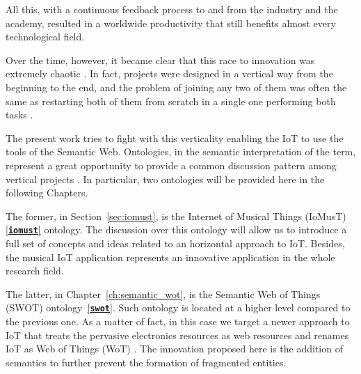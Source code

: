 \documentclass[11pt, twoside, openright]{report}   	%
\newcommand{\ontoref}[1]{\hyperref[sec:ontology_list]{[\textbf{\texttt{#1}}]}}
\begin{document}
All this, with a continuous feedback process to and from the industry and the academy, resulted in a worldwide productivity that still benefits almost every technological field. 

Over the time, however, it became clear that this race to innovation was extremely chaotic \cite{farhan2018concise}. In fact, projects were designed in a vertical way from the beginning to the end, and the problem of joining any two of them was often the same as restarting both of them from scratch in a single one performing both tasks \cite{al2015toward}.

The present work tries to fight with this verticality enabling the IoT to use the tools of the Semantic Web. Ontologies, in the semantic interpretation of the term, represent a great opportunity to provide a common discussion pattern among vertical projects \cite{shadbolt2006semantic}. In particular, two ontologies will be provided here in the following Chapters.

The former, in Section~\ref{sec:iomust}, is the Internet of Musical Things (IoMusT) \ontoref{iomust} ontology. The discussion over this ontology will allow us to introduce a full set of concepts and ideas related to an horizontal approach to IoT. Besides, the musical IoT application represents an innovative application in the whole research field.

The latter, in Chapter~\ref{ch:semantic_wot}, is the Semantic Web of Things (SWOT) ontology~\ontoref{swot}. Such ontology is located at a higher level compared to the previous one. As a matter of fact, in this case we target a newer approach to IoT that treats the pervasive electronics resources as web resources and renames IoT as Web of Things (WoT) \cite{guinard2011internet, zeng2011web}. The innovation proposed here is the addition of semantics to further prevent the formation of fragmented entities.

 
\end{document}
